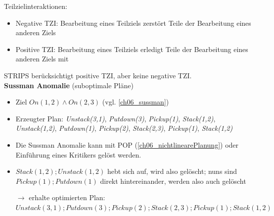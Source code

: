 Teilzielinteraktionen:
\begin{itemize}
	\item Negative TZI: Bearbeitung eines Teilziels zerstört Teile der Bearbeitung eines anderen Ziels
	\item Positive TZI: Bearbeitung eines Teilziels erledigt Teile der Bearbeitung eines anderen Ziels mit
\end{itemize}
STRIPS berücksichtigt positive TZI, aber keine negative TZI.\\

\textbf{Sussman Anomalie} (suboptimale Pläne)
\begin{itemize}
	\item Ziel $On(1,2) \wedge On(2,3)$ (vgl. \autoref{ch06_sussman})
	\item Erzeugter Plan: \emph{Unstack(3,1)}, \emph{Putdown(3)}, \emph{Pickup(1)}, \emph{Stack(1,2)}, \emph{Unstack(1,2)}, \emph{Putdown(1)}, \emph{Pickup(2)}, \emph{Stack(2,3)}, \emph{Pickup(1)}, \emph{Stack(1,2)}
	\item Die Sussman Anomalie kann mit POP (\autoref{ch06_nichtlinearePlanung}) oder Einführung eines Kritikers gelöst werden.
	\item $Stack(1,2); Unstack(1,2)$ hebt sich auf, wird also gelöscht; nuns sind $Pickup(1); Putdown(1)$ direkt hintereinander, werden also auch gelöscht
	\item[$\rightarrow$] erhalte optimierten Plan: $Unstack(3,1); Putdown(3); Pickup(2); Stack(2,3); Pickup(1); Stack(1,2)$
\end{itemize}

